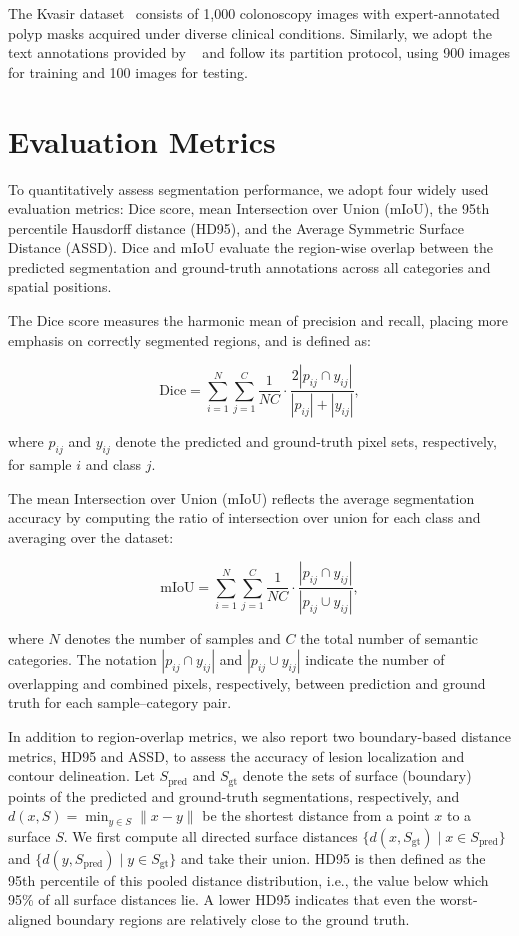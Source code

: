\documentclass{article} %
\begin{document}
The Kvasir dataset~\cite{jha2019kvasir} consists of 1{,}000 colonoscopy images with expert-annotated polyp masks acquired under diverse clinical conditions. Similarly, we adopt the text annotations provided by ~\cite{zhang2024madapter} and follow its partition protocol, using 900 images for training and 100 images for testing.

\section{Evaluation Metrics}
\label{sec:Metrics}

To quantitatively assess segmentation performance, we adopt four widely used evaluation metrics: Dice score, mean Intersection over Union (mIoU), the 95th percentile Hausdorff distance (HD95), and the Average Symmetric Surface Distance (ASSD). Dice and mIoU evaluate the region-wise overlap between the predicted segmentation and ground-truth annotations across all categories and spatial positions.

The Dice score measures the harmonic mean of precision and recall, placing more emphasis on correctly segmented regions, and is defined as:

\begin{equation}
\mathrm{Dice} = \sum_{i=1}^{N} \sum_{j=1}^{C} \frac{1}{NC} \cdot \frac{2|p_{ij} \cap y_{ij}|}{|p_{ij}| + |y_{ij}|},
\end{equation}

where $p_{ij}$ and $y_{ij}$ denote the predicted and ground-truth pixel sets, respectively, for sample $i$ and class $j$.

The mean Intersection over Union (mIoU) reflects the average segmentation accuracy by computing the ratio of intersection over union for each class and averaging over the dataset:

\begin{equation}
\mathrm{mIoU} = \sum_{i=1}^{N} \sum_{j=1}^{C} \frac{1}{NC} \cdot \frac{|p_{ij} \cap y_{ij}|}{|p_{ij} \cup y_{ij}|},
\end{equation}

where $N$ denotes the number of samples and $C$ the total number of semantic categories. The notation $|p_{ij} \cap y_{ij}|$ and $|p_{ij} \cup y_{ij}|$ indicate the number of overlapping and combined pixels, respectively, between prediction and ground truth for each sample–category pair.

In addition to region-overlap metrics, we also report two boundary-based distance metrics, HD95 and ASSD, to assess the accuracy of lesion localization and contour delineation. Let $S_{\mathrm{pred}}$ and $S_{\mathrm{gt}}$ denote the sets of surface (boundary) points of the predicted and ground-truth segmentations, respectively, and $d(x,S)=\min_{y\in S}\|x-y\|$ be the shortest distance from a point $x$ to a surface $S$. We first compute all directed surface distances $\{d(x,S_{\mathrm{gt}})\mid x\in S_{\mathrm{pred}}\}$ and $\{d(y,S_{\mathrm{pred}})\mid y\in S_{\mathrm{gt}}\}$ and take their union. HD95 is then defined as the 95th percentile of this pooled distance distribution, i.e., the value below which 95\% of all surface distances lie. A lower HD95 indicates that even the worst-aligned boundary regions are relatively close to the ground truth.
\end{document}
